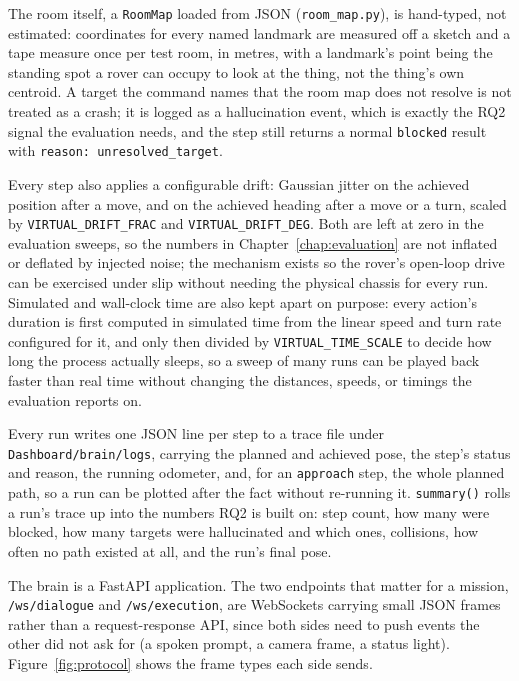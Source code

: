 The room itself, a \texttt{RoomMap} loaded from JSON
(\texttt{room\_map.py}), is hand-typed, not estimated: coordinates for every
named landmark are measured off a sketch and a tape measure once per test
room, in metres, with a landmark's point being the standing spot a rover can
occupy to look at the thing, not the thing's own centroid. A target the
command names that the room map does not resolve is not treated as a crash;
it is logged as a hallucination event, which is exactly the RQ2 signal the
evaluation needs, and the step still returns a normal \texttt{blocked} result
with \texttt{reason: unresolved\_target}.

Every step also applies a configurable drift: Gaussian jitter on the achieved
position after a move, and on the achieved heading after a move or a turn,
scaled by \texttt{VIRTUAL\_DRIFT\_FRAC} and \texttt{VIRTUAL\_DRIFT\_DEG}. Both
are left at zero in the evaluation sweeps, so the numbers in
Chapter~\ref{chap:evaluation} are not inflated or deflated by injected noise;
the mechanism exists so the rover's open-loop drive can be exercised under
slip without needing the physical chassis for every run. Simulated and
wall-clock time are also kept apart on purpose: every action's duration is
first computed in simulated time from the linear speed and turn rate
configured for it, and only then divided by \texttt{VIRTUAL\_TIME\_SCALE} to
decide how long the process actually sleeps, so a sweep of many runs can be
played back faster than real time without changing the distances, speeds, or
timings the evaluation reports on.

Every run writes one JSON line per step to a trace file under
\texttt{Dashboard/brain/logs}, carrying the planned and achieved pose, the
step's status and reason, the running odometer, and, for an \texttt{approach}
step, the whole planned path, so a run can be plotted after the fact without
re-running it. \texttt{summary()} rolls a run's trace up into the numbers
RQ2 is built on: step count, how many were blocked, how many targets were
hallucinated and which ones, collisions, how often no path existed at all,
and the run's final pose.

\label{sec:protocol}

The brain is a FastAPI application. The two endpoints that matter for a mission,
\texttt{/ws/dialogue} and \texttt{/ws/execution}, are WebSockets carrying small
JSON frames rather than a request-response API, since both sides need to push
events the other did not ask for (a spoken prompt, a camera frame, a status
light). Figure~\ref{fig:protocol} shows the frame types each side sends.

